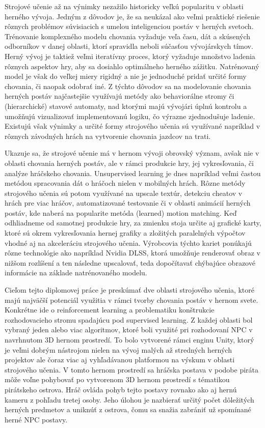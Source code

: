 \documentclass[slovak, master]{diploma}
\begin{document}
Strojové učenie až na výnimky nezažilo historicky veľkú popularitu v oblasti herného vývoja. Jedným z dôvodov je, že sa neukázal ako veľmi praktické riešenie rôznych problémov súvisiacich s umelou inteligenciou postáv v herných svetoch. Trénovanie komplexného modelu chovania vyžaduje veľa času, dát a skúsených odborníkov v danej oblasti, ktorí spravidla neboli súčasťou vývojárskych tímov. Herný vývoj je taktiež veľmi iteratívny proces, ktorý vyžaduje množstvo ladenia rôznych aspektov hry, aby sa dosiahlo optimálneho herného zážitku. Natrénovaný model je však do veľkej miery rigidný a nie je jednoduché pridať určité formy chovania, či naopak odobrať iné. Z týchto dôvodov sa na modelovanie chovania herných postáv najčastejšie využívajú metódy ako behaviorálne stromy či (hierarchické) stavové automaty, nad ktorými majú vývojári úplnú kontrolu a umožňujú vizualizovať implementovanú logiku, čo výrazne zjednodušuje ladenie. Existujú však výnimky a určité formy strojového učenia sú využívané napríklad v rôznych závodných hrách na vytvorenie chovania jazdcov na trati. 

Ukazuje sa, že strojové učenie má v hernom vývoji obrovský význam, avšak nie v oblasti chovania herných postáv, ale v rámci produkcie hry, jej vykresľovania, či analýze hráčskeho chovania. Unsupervised learning je dnes napríklad veľmi častou metódou spracovania dát o hráčoch nielen v mobilných hrách. Rôzne metódy strojového učenia sú potom využívané na upscale textúr, detekciu cheatov v hrách pre viac hráčov, automatizované testovanie či v oblasti animácií herných postáv, kde naberá na popularite metóda (learned) motion matching. Keď odhliadneme od samotnej produkcie hry, za zmienku stoja určite aj grafické karty, ktoré sú okrem vykresľovania hernej grafiky a zložitých paralelných výpočtov vhodné aj na akceleráciu strojového učenia. Výrobcovia týchto kariet ponúkajú rôzne technológie ako napríklad Nvidia DLSS, ktorá umožňuje renderovať obraz v nižšom rozlíšení a ten následne upscalovať, teda dopočítavať chýbajúce obrazové informácie na základe natrénovaného modelu.

Cieľom tejto diplomovej práce je preskúmať dve oblasti strojového učenia, ktoré majú najväčší potenciál využitia v rámci tvorby chovania postáv v hernom svete. Konkrétne ide o reinforcement learning a problematiku konštrukcie rozhodovacieho stromu spadajúcu pod supervised learning. Z každej oblasti bol vybraný jeden alebo viac algoritmov, ktoré boli využité pri rozhodovaní NPC v navrhnutom 3D hernom prostredí. To bolo vytvorené rámci enginu Unity, ktorý je veľmi dobrým nástrojom nielen na vývoj malých až stredných herných projektov ale čoraz viac aj vyhľadávanou platformou na výskum v oblasti strojového učenia. V tomto hernom prostredí sa hráčska postava v podobe piráta môže voľne pohybovať po vytvorenom 3D hernom prostredí s tématikou pirátskeho ostrova. Hráč ovláda pohyb tejto postavy rovnako ako aj hernú kameru z pohľadu tretej osoby. Jeho úlohou je nazbierať určitý počet dôležitých herných predmetov a uniknúť z ostrova, čomu sa snažia zabrániť už spomínané herné NPC postavy. 
\end{document}
